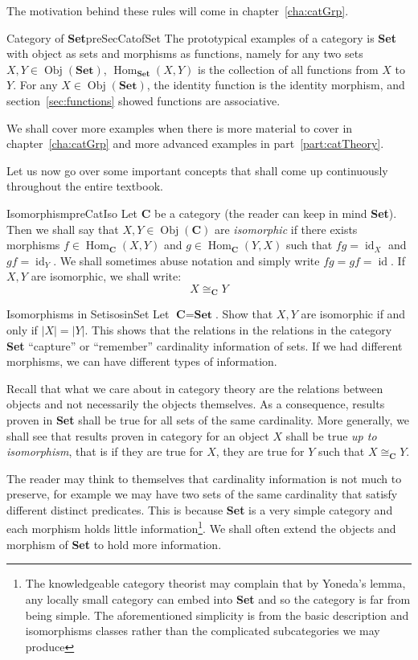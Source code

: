 \documentclass{book}
\newcommand{\id}{{\operatorname{id}}}
\newcommand{\Hom}{{\operatorname{Hom}}}
\newcommand{\Obj}{{\operatorname{Obj}}}
\renewcommand{\bf}[1]{\textbf{#1}}
\begin{document}
The motivation behind these rules will come in chapter~\ref{cha:catGrp}.

\begin{example}{Category of \textbf{Set}}{preSecCatofSet}
	The prototypical examples of a category is \textbf{Set} with object as sets and morphisms as
	functions, namely for any two sets $X,Y \in \Obj(\bf{Set})$, $\Hom_{\bf{Set}}(X,Y)$ is the collection
	of all functions from $X$ to $Y$. For any $X \in \Obj(\bf{Set})$, the identity function is the
	identity morphism, and section~\ref{sec:functions} showed functions are associative.


	We shall cover more examples when there is more material to cover in chapter~\ref{cha:catGrp} and more
	advanced examples in part~\ref{part:catTheory}.
\end{example}

Let us now go over some important concepts that shall come up continuously throughout the entire textbook.

\begin{defn}{Isomorphism}{preCatIso}
	Let \textbf{C} be a category (the reader can keep in mind \textbf{Set}). Then we shall say that $X,Y \in
	\Obj(\bf{C})$ are \emph{isomorphic} if there exists morphisms $f \in \Hom_{\bf{C}}(X, Y)$ and $g \in
	\Hom_{\bf{C}}(Y,X)$ such that $fg = \id_X$ and $gf = \id_Y$. We shall sometimes abuse notation and simply
	write $fg = gf = \id$. If $X,Y$ are isomorphic, we shall write:
	\[
		X\cong_\bf{C} Y
	\]
\end{defn}

\begin{example}{Isomorphisms in Set}{isosinSet}
	Let $\bf{C} = \bf{Set}$. Show that $X,Y$ are isomorphic if and only if $|X| = |Y|$. This shows that the relations in
	the relations in the category \textbf{Set} ``capture'' or ``remember'' cardinality information of sets. If
	we had different morphisms, we can have different types of information.

	Recall that what we care about in category theory are the relations between objects and not necessarily
	the objects themselves. As a consequence, results proven in \textbf{Set} shall be true for all sets of the
	same cardinality. More generally, we shall see that results proven in category for an object $X$ shall be
	true \emph{up to isomorphism}, that is if they are true for $X$, they are true for $Y$ such that $X
	\cong_{\bf{C}} Y$.

	The reader may think to themselves that cardinality information is not much to preserve, for example we
	may have two sets of the same cardinality that satisfy different distinct predicates. This is because \textbf{Set} is a very simple category and each morphism holds little
	information\footnote{The knowledgeable
	category theorist may complain that by Yoneda's lemma, any locally small category can embed into
	\textbf{Set} and so the category is far from being simple. The aforementioned
	simplicity is from the basic description and isomorphisms classes rather than the complicated
	subcategories we may produce}. We shall often extend the objects and morphism of \textbf{Set} to hold more
	information.
\end{example}
\end{document}
